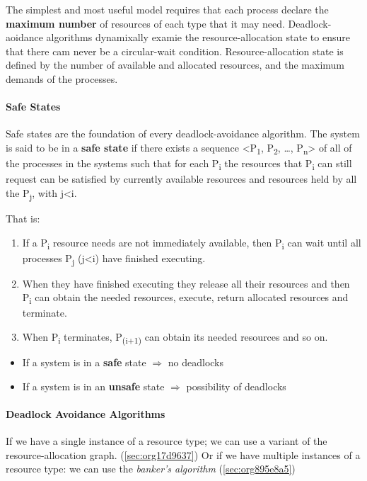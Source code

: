\documentclass{article}%
\begin{document}
The simplest and most useful model requires that each process declare the \textbf{maximum number} of resources of each type that it may need.
Deadlock-aoidance algorithms dynamixally examie the resource-allocation state to ensure that there cam never be a circular-wait condition.
Resource-allocation state is defined by the number of available and allocated resources, and the maximum demands of the processes.

\paragraph{Safe States}
\label{sec:orgba7a8cb}
Safe states are the foundation of every deadlock-avoidance algorithm.
The system is said to be in a \textbf{safe state} if there exists a sequence <P\textsubscript{1}, P\textsubscript{2}, \ldots{}, P\textsubscript{n}> of all of the processes in the systems such that for each P\textsubscript{i} the resources that P\textsubscript{i} can still request can be satisfied by currently available resources and resources held by all the P\textsubscript{j}, with j<i.

That is:
\begin{enumerate}
\item If a P\textsubscript{i} resource needs are not immediately available, then P\textsubscript{i} can wait until all processes P\textsubscript{j} (j<i) have finished executing.
\item When they have finished executing they release all their resources and then P\textsubscript{i} can obtain the needed resources, execute, return allocated resources and terminate.
\item When P\textsubscript{i} terminates, P\textsubscript{(i+1)} can obtain its needed resources and so on.
\end{enumerate}


\begin{itemize}
\item If a system is in a \textbf{safe} state \(\Rightarrow\) no deadlocks
\item If a system is in an \textbf{unsafe} state \(\Rightarrow\) possibility of deadlocks
\end{itemize}

\paragraph{Deadlock Avoidance Algorithms}
\label{sec:org2e58b47}
If we have a single instance of a resource type; we can use a variant of the resource-allocation graph. (\ref{sec:org17d9637})
Or if we have multiple instances of a resource type: we can use the \emph{banker's algorithm} (\ref{sec:org895e8a5})
\end{document}
